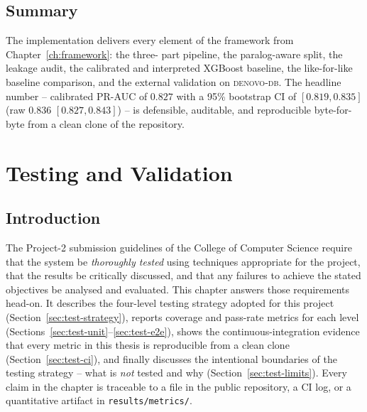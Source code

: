 \documentclass[11pt,a4paper,oneside]{report}
\begin{document}
\section{Summary}
\label{sec:impl-summary}

The implementation delivers every element of the
framework from Chapter~\ref{ch:framework}: the three-
part pipeline, the paralog-aware split, the leakage
audit, the calibrated and interpreted XGBoost
baseline, the like-for-like baseline comparison, and
the external validation on \textsc{denovo-db}. The
headline number -- calibrated PR-AUC of $0.827$ with a
95\% bootstrap CI of $[0.819, 0.835]$ (raw $0.836$
$[0.827, 0.843]$) -- is defensible,
auditable, and reproducible byte-for-byte from a
clean clone of the repository.


\chapter{Testing and Validation}
\label{ch:testing}

\section{Introduction}
\label{sec:test-intro}

The Project-2 submission guidelines of the College of
Computer Science require that the system be
\emph{thoroughly tested} using techniques appropriate for
the project, that the results be critically discussed, and
that any failures to achieve the stated objectives be
analysed and evaluated. This chapter answers those
requirements head-on. It describes the four-level testing
strategy adopted for this project
(Section~\ref{sec:test-strategy}), reports coverage and
pass-rate metrics for each level
(Sections~\ref{sec:test-unit}--\ref{sec:test-e2e}), shows
the continuous-integration evidence that every metric in
this thesis is reproducible from a clean clone
(Section~\ref{sec:test-ci}), and finally discusses the
intentional boundaries of the testing strategy -- what
is \emph{not} tested and why
(Section~\ref{sec:test-limits}). Every claim in the chapter
is traceable to a file in the public repository, a CI log,
or a quantitative artifact in \texttt{results/metrics/}.
\end{document}
